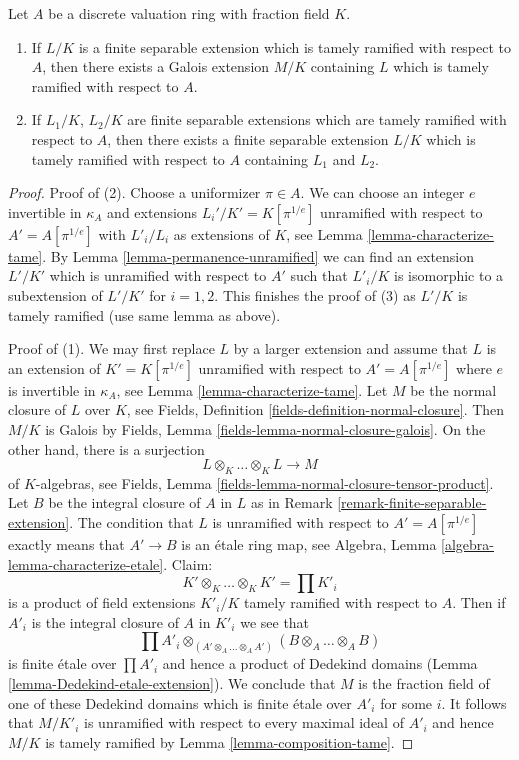 \begin{lemma}
\label{lemma-permanence-tame}
Let $A$ be a discrete valuation ring with fraction field $K$.
\begin{enumerate}
\item If $L/K$ is a finite separable extension which is tamely
ramified with respect to $A$, then there exists a Galois
extension $M/K$ containing $L$ which is tamely ramified
with respect to $A$.
\item If $L_1/K$, $L_2/K$ are finite separable extensions which are tamely
ramified with respect to $A$, then there exists a finite
separable extension $L/K$ which is tamely ramified with respect
to $A$ containing $L_1$ and $L_2$.
\end{enumerate}
\end{lemma}

\begin{proof}
Proof of (2). Choose a uniformizer $\pi \in A$.
We can choose an integer $e$ invertible
in $\kappa_A$ and extensions $L_i'/K' = K[\pi^{1/e}]$
unramified with respect to $A' = A[\pi^{1/e}]$
with $L'_i/L_i$ as extensions of $K$, see
Lemma \ref{lemma-characterize-tame}.
By Lemma \ref{lemma-permanence-unramified}
we can find an extension $L'/K'$ which is unramified
with respect to $A'$ such that $L'_i/K$ is isomorphic
to a subextension of $L'/K'$ for $i = 1, 2$.
This finishes the proof of (3) as $L'/K$ is tamely ramified
(use same lemma as above).

\medskip\noindent
Proof of (1). We may first replace $L$ by a larger extension
and assume that $L$ is an extension of $K' = K[\pi^{1/e}]$
unramified with respect to $A' = A[\pi^{1/e}]$ where $e$ is
invertible in $\kappa_A$, see Lemma \ref{lemma-characterize-tame}.
Let $M$ be the normal closure of $L$ over $K$, see
Fields, Definition \ref{fields-definition-normal-closure}.
Then $M/K$ is Galois by Fields, Lemma \ref{fields-lemma-normal-closure-galois}.
On the other hand, there is a surjection
$$
L \otimes_K \ldots \otimes_K L \longrightarrow M
$$
of $K$-algebras, see Fields, Lemma
\ref{fields-lemma-normal-closure-tensor-product}.
Let $B$ be the integral closure of $A$ in $L$
as in Remark \ref{remark-finite-separable-extension}. The
condition that $L$ is unramified with respect to $A' = A[\pi^{1/e}]$
exactly means that $A' \to B$ is an \'etale ring map, see
Algebra, Lemma \ref{algebra-lemma-characterize-etale}.
Claim: 
$$
K' \otimes_K \ldots \otimes_K K' = \prod K'_i
$$
is a product of field extensions $K'_i/K$ tamely
ramified with respect to $A$. Then if $A'_i$ is the integral
closure of $A$ in $K'_i$ we see that
$$
\prod A'_i \otimes_{(A' \otimes_A \ldots \otimes_A A')}
(B \otimes_A \ldots \otimes_A B)
$$
is finite \'etale over $\prod A'_i$ and hence a product of
Dedekind domains (Lemma \ref{lemma-Dedekind-etale-extension}).
We conclude that $M$ is the fraction field
of one of these Dedekind domains which is finite \'etale
over $A'_i$ for some $i$. It follows that $M/K'_i$
is unramified with respect to every maximal ideal of $A'_i$
and hence $M/K$ is tamely ramified by Lemma \ref{lemma-composition-tame}.


\end{proof}
